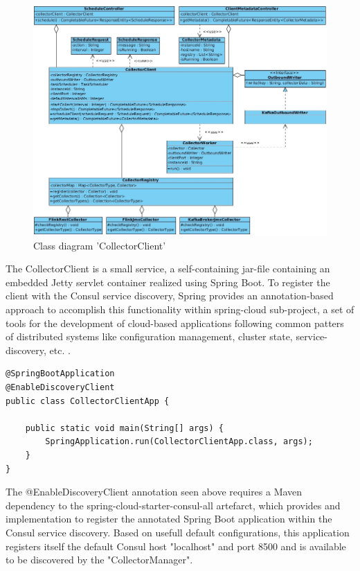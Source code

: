 \begin{figure}[H]
	\centering
	\includegraphics[width=1.0\textwidth]{../uml/class-collector-client.jpg}
	\caption{Class diagram 'CollectorClient'}
	\label{class-diagram-collector-client}
\end{figure}

The CollectorClient is a small service, a self-containing jar-file containing an embedded Jetty servlet container realized using
Spring Boot. To register the client with the Consul service discovery, Spring provides an annotation-based approach to accomplish
this functionality within spring-cloud sub-project, a set of tools for the development of cloud-based applications following common patters
of distributed systems like configuration management, cluster state, service-discovery, etc. .

\begin{lstlisting}[caption={"CollectorClientApp", Client registration}, captionpos=b, label={lst:collector-client-registration}]
@SpringBootApplication
@EnableDiscoveryClient
public class CollectorClientApp {

    public static void main(String[] args) {
        SpringApplication.run(CollectorClientApp.class, args);
    }
}
\end{lstlisting}

The @EnableDiscoveryClient annotation seen above requires a Maven dependency to the spring-cloud-starter-consul-all artefarct,
which provides and implementation to register the annotated Spring Boot application within the Consul service discovery. Based
on usefull default configurations, this application registers itself the default Consul host "localhost" and port 8500 and is
available to be discovered by the "CollectorManager".

